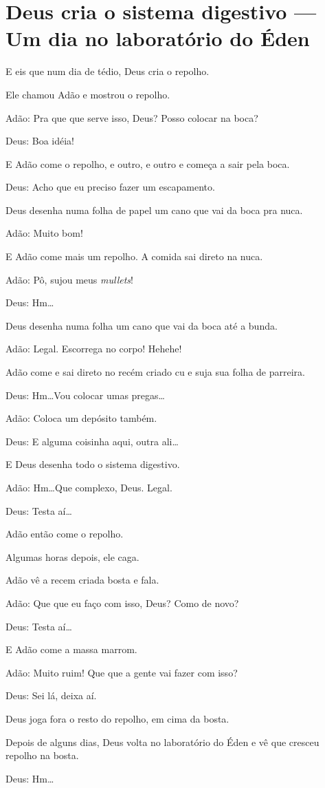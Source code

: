 \chapter{Deus cria o sistema digestivo --- Um dia no laboratório do Éden}

E eis que num dia de tédio, Deus cria o repolho.

Ele chamou Adão e mostrou o repolho.

Adão: Pra que que serve isso, Deus? Posso colocar na boca?

\enlargethispage{\baselineskip}

Deus: Boa idéia!

E Adão come o repolho, e outro, e outro e começa a sair pela boca.

Deus: Acho que eu preciso fazer um escapamento.

Deus desenha numa folha de papel um cano que vai da boca pra nuca.

Adão: Muito bom!

E Adão come mais um repolho. A comida sai direto na nuca.

Adão: Pô, sujou meus \emph{mullets}!

Deus: Hm\ldots

Deus desenha numa folha um cano que vai da boca até a bunda.

Adão: Legal. Escorrega no corpo! Hehehe!

Adão come e sai direto no recém criado cu e suja sua folha de parreira.

Deus: Hm\ldots Vou colocar umas pregas\ldots

Adão: Coloca um depósito também.

Deus: E alguma coisinha aqui, outra ali\ldots

E Deus desenha todo o sistema digestivo.

Adão: Hm\ldots Que complexo, Deus. Legal.

Deus: Testa aí\ldots

Adão então come o repolho.

Algumas horas depois, ele caga.

Adão vê a recem criada bosta e fala.

Adão: Que que eu faço com isso, Deus? Como de novo?

Deus: Testa aí\ldots

E Adão come a massa marrom.

Adão: Muito ruim! Que que a gente vai fazer com isso? 

Deus: Sei lá, deixa aí.

\enlargethispage{\baselineskip}

Deus joga fora o resto do repolho, em cima da bosta.

Depois de alguns dias, Deus volta no laboratório do Éden e vê que cresceu repolho na bosta.

Deus: Hm\ldots

